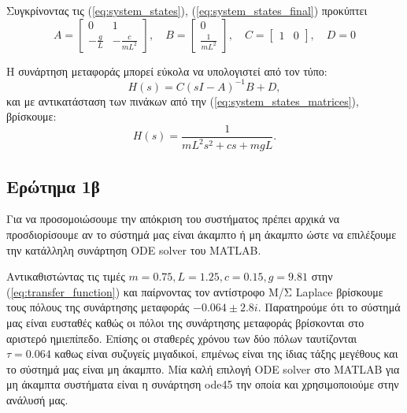 \documentclass[a4paper,12pt]{article}
\begin{document}
Συγκρίνοντας τις (\ref{eq:system_states}), (\ref{eq:system_states_final}) προκύπτει
\begin{equation}
    A = 
    \left[
    \begin{matrix}
        0 & 1 \\
        -\frac{g}{L} & -\frac{c}{mL^2}
    \end{matrix}
    \right], \quad
    B = 
    \left[
    \begin{matrix}
        0 \\
        \frac{1}{mL^2}
    \end{matrix}
    \right], \quad
    C = 
    \left[
    \begin{matrix}
        1 & 0
    \end{matrix}
    \right], \quad
    D = 0
    \label{eq:system_states_matrices}
\end{equation}

Η συνάρτηση μεταφοράς μπορεί εύκολα να υπολογιστεί από τον τύπο:
\begin{equation}
    H(s) = C (sI-A)^{-1}B + D,
    \label{eq:transfer_function_formula}
\end{equation}
και με αντικατάσταση των πινάκων από την (\ref{eq:system_states_matrices}), βρίσκουμε:
\begin{equation}
    H(s) = \frac{1}{mL^2s^2 + cs + mgL}.
    \label{eq:transfer_function}
\end{equation}

\subsection*{Ερώτημα 1β}
Για να προσομοιώσουμε την απόκριση του συστήματος πρέπει αρχικά να προσδιορίσουμε αν το σύστημά μας είναι άκαμπτο ή 
μη άκαμπτο ώστε να επιλέξουμε την κατάλληλη συνάρτηση ODE solver του 
MATLAB.

Αντικαθιστώντας τις τιμές $m = 0.75, L = 1.25, c = 0.15, g = 9.81$ στην (\ref{eq:transfer_function}) και παίρνοντας 
τον αντίστροφο Μ/Σ Laplace βρίσκουμε τους πόλους της συνάρτησης μεταφοράς
$-0.064\pm2.8i$. Παρατηρούμε ότι το σύστημά μας είναι ευσταθές καθώς οι πόλοι της συνάρτησης μεταφοράς βρίσκονται στο 
αριστερό ημιεπίπεδο. Επίσης οι σταθερές χρόνου των δύο πόλων ταυτίζονται $\tau=0.064$ καθως είναι συζυγείς μιγαδικοί, 
επμένως είναι της ίδιας τάξης μεγέθους και το σύστημά μας είναι μη άκαμπτο. Μία καλή επιλογή 
ODE solver στο MATLAB 
για μη άκαμπτα συστήματα είναι η συνάρτηση ode45 την οποία και 
χρησιμοποιούμε στην ανάλυσή μας.
\end{document}
